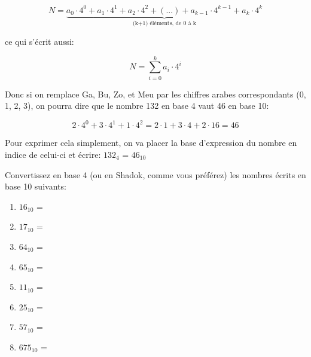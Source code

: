 \documentclass[12pt]{article}
\newenvironment{alphenum}
{\begin{enumerate}[label=\alph*.]}
	{\end{enumerate}}
\begin{document}
	\[ N = \underbrace{a_0 \cdot 4^0 + a_1 \cdot 4^1 + a_2 \cdot 4^2 + (...) + a_{k-1} \cdot 4^{k-1} + a_k \cdot 4^k}_{\text{(k+1)\ éléments, de 0 à k}}\]
	
	ce qui s'écrit aussi:
	
	\[ N = \sum_{i=0}^{k} a_i \cdot 4^i \]
	
	Donc si on remplace Ga, Bu, Zo, et Meu par les chiffres arabes correspondants (0, 1, 2, 3), on pourra dire que le nombre 132 en base 4 vaut 46 en base 10:
	
	\[ 2 \cdot 4^0 + 3 \cdot 4^1 + 1 \cdot 4^2  = 2 \cdot 1 + 3 \cdot 4 + 2 \cdot 16 = 46\]
	
	Pour exprimer cela simplement, on va placer la base d'expression du nombre en indice de celui-ci et écrire: $132_4$ = $46_{10}$
	
	\begin{MonExo}
		Convertissez en base 4 (ou en Shadok, comme vous préférez) les nombres écrits en base 10 suivants:
		\begin{alphenum}
			\item $16_{10}$ =
			\item $17_{10}$ =
			\item $64_{10}$ =
			\item $65_{10}$ =
			\item $11_{10}$ =
			\item $25_{10}$ =
			\item $57_{10}$ =
			\item $675_{10}$ =
		\end{alphenum}
	\end{MonExo}
	
\end{document}
